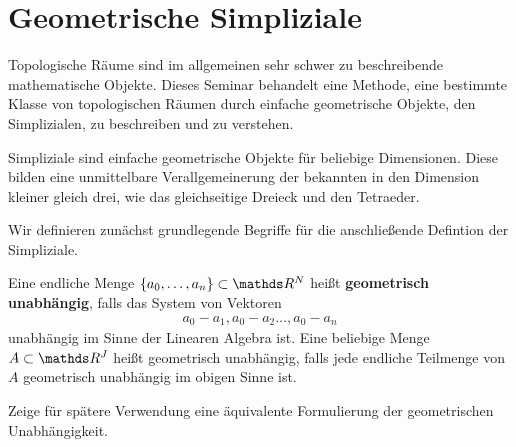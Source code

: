 





\section{Geometrische Simpliziale}


Topologische Räume sind im allgemeinen sehr schwer zu beschreibende
mathematische Objekte. Dieses Seminar behandelt eine Methode, eine
bestimmte Klasse von topologischen Räumen durch einfache geometrische
Objekte, den Simplizialen, zu beschreiben und zu verstehen.

Simpliziale sind einfache geometrische Objekte für beliebige
Dimensionen. Diese bilden eine unmittelbare Verallgemeinerung der
bekannten in den Dimension kleiner gleich drei, wie das gleichseitige
Dreieck und den Tetraeder.

Wir definieren zunächst grundlegende Begriffe für die anschließende
Defintion der Simpliziale.

\begin{Def}
  \label{def:1}
  Eine endliche Menge $\{ a_0,\ldots ,a_n \} \subset \R^N$ heißt
  \textbf{geometrisch unabhängig}, falls das System von Vektoren
  \begin{gather*}
    a_0 - a_1 , a_0 - a_2 \ldots , a_0 - a_n
  \end{gather*}
  unabhängig im Sinne der Linearen Algebra ist. Eine beliebige Menge
  $A \subset \R^J$ heißt geometrisch unabhängig, falls jede endliche
  Teilmenge von $A$ geometrisch unabhängig im obigen Sinne ist.
\end{Def}
Zeige für spätere Verwendung eine äquivalente Formulierung der
geometrischen Unabhängigkeit.

